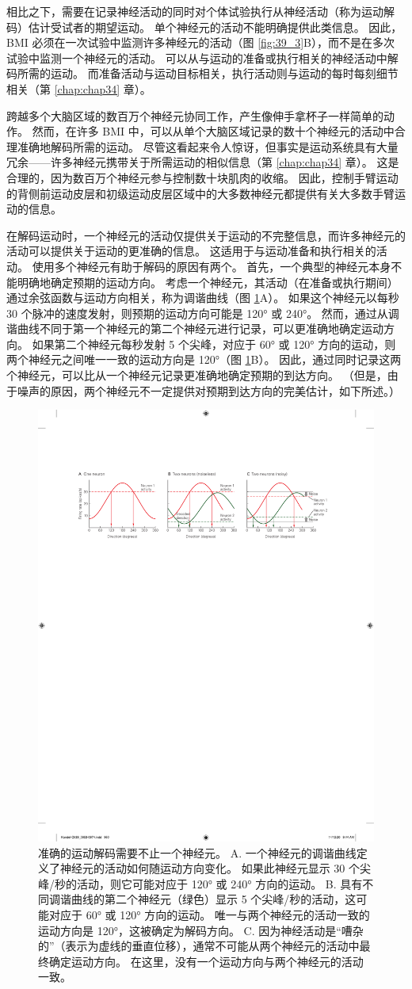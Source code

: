 相比之下，需要在记录神经活动的同时对个体试验执行从神经活动（称为运动解码）估计受试者的期望运动。 单个神经元的活动不能明确提供此类信息。 
因此，BMI 必须在一次试验中监测许多神经元的活动（图 \ref{fig:39_3}B），而不是在多次试验中监测一个神经元的活动。 
可以从与运动的准备或执行相关的神经活动中解码所需的运动。 
而准备活动与运动目标相关，执行活动则与运动的每时每刻细节相关（第 \ref{chap:chap34} 章）。


跨越多个大脑区域的数百万个神经元协同工作，产生像伸手拿杯子一样简单的动作。 
然而，在许多 BMI 中，可以从单个大脑区域记录的数十个神经元的活动中合理准确地解码所需的运动。 
尽管这看起来令人惊讶，但事实是运动系统具有大量冗余——许多神经元携带关于所需运动的相似信息（第 \ref{chap:chap34} 章）。 
这是合理的，因为数百万个神经元参与控制数十块肌肉的收缩。 
因此，控制手臂运动的背侧前运动皮层和初级运动皮层区域中的大多数神经元都提供有关大多数手臂运动的信息。


在解码运动时，一个神经元的活动仅提供关于运动的不完整信息，而许多神经元的活动可以提供关于运动的更准确的信息。 
这适用于与运动准备和执行相关的活动。 使用多个神经元有助于解码的原因有两个。 
首先，一个典型的神经元本身不能明确地确定预期的运动方向。 
考虑一个神经元，其活动（在准备或执行期间）通过余弦函数与运动方向相关，称为调谐曲线（图 \ref{fig:39_4}A）。 
如果这个神经元以每秒 30 个脉冲的速度发射，则预期的运动方向可能是 120° 或 240°。 
然而，通过从调谐曲线不同于第一个神经元的第二个神经元进行记录，可以更准确地确定运动方向。 
如果第二个神经元每秒发射 5 个尖峰，对应于 60° 或 120° 方向的运动，则两个神经元之间唯一一致的运动方向是 120°（图 \ref{fig:39_4}B）。 
因此，通过同时记录这两个神经元，可以比从一个神经元记录更准确地确定预期的到达方向。 
（但是，由于噪声的原因，两个神经元不一定提供对预期到达方向的完美估计，如下所述。）

\begin{figure}[htbp]
	\centering
	\includegraphics[width=0.5\linewidth]{chap39/fig_39_4}
	\caption{准确的运动解码需要不止一个神经元。 
		A. 一个神经元的调谐曲线定义了神经元的活动如何随运动方向变化。 
		如果此神经元显示 30 个尖峰/秒的活动，则它可能对应于 120° 或 240° 方向的运动。 
		B. 具有不同调谐曲线的第二个神经元（绿色）显示 5 个尖峰/秒的活动，这可能对应于 60° 或 120° 方向的运动。 
		唯一与两个神经元的活动一致的运动方向是 120°，这被确定为解码方向。 
		C. 因为神经活动是“嘈杂的”（表示为虚线的垂直位移），通常不可能从两个神经元的活动中最终确定运动方向。 
		在这里，没有一个运动方向与两个神经元的活动一致。}
	\label{fig:39_4}
\end{figure}


